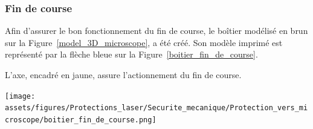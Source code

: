 \subsubsection{Fin de course}
\begin{minipage}[c]{0.48\textwidth}
    Afin d'assurer le bon fonctionnement du fin de course, le boîtier modélisé en \textcolor[RGB]{120, 70, 30}{brun} sur la Figure~\ref{model_3D_microscope}, a été créé. Son modèle imprimé est représenté par la flèche \textcolor[RGB]{115, 210, 210}{bleue} sur la Figure~\ref{boitier_fin_de_course}.

    \vspace{1em}
    L'axe, encadré en \textcolor[RGB]{233, 173, 56}{jaune}, assure l'actionnement du fin de course.

\end{minipage}\hfill
\begin{minipage}[c]{0.48\textwidth}
    \begin{center}
        \texttt{[image: assets/figures/Protections\_laser/Securite\_mecanique/Protection\_vers\_microscope/boitier\_fin\_de\_course.png]}
    \end{center}
    \label{boitier_fin_de_course}
\end{minipage}